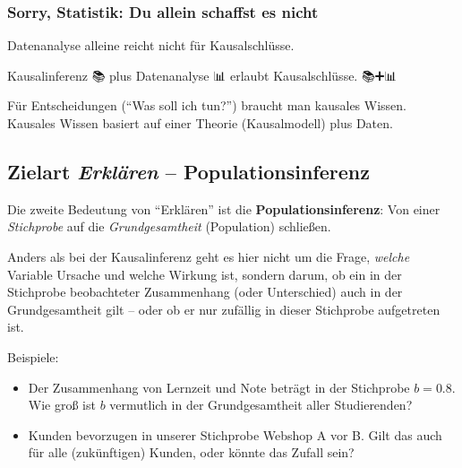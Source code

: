 \documentclass[
  ngerman,
  letterpaper,
  twoside,
  open=any]{scrbook}
\providecommand{\tightlist}{%
  \setlength{\itemsep}{0pt}\setlength{\parskip}{0pt}}\usepackage{longtable,booktabs,array}
\theoremstyle{definition}
\theoremstyle{plain}
\theoremstyle{definition}
\theoremstyle{definition}
\theoremstyle{remark}
\begin{document}
\subsubsection{Sorry, Statistik: Du allein schaffst es
nicht}\label{sorry-statistik-du-allein-schaffst-es-nicht}

Datenanalyse alleine reicht nicht für Kausalschlüsse. 🧟

Kausalinferenz 📚 plus Datenanalyse 📊 erlaubt Kausalschlüsse. 📚➕📊 🟰
🤩

\begin{tcolorbox}[enhanced jigsaw, arc=.35mm, bottomrule=.15mm, bottomtitle=1mm, breakable, colback=white, colbacktitle=quarto-callout-important-color!10!white, colframe=quarto-callout-important-color-frame, coltitle=black, left=2mm, leftrule=.75mm, opacityback=0, opacitybacktitle=0.6, rightrule=.15mm, title=\textcolor{quarto-callout-important-color}{\faExclamation}\hspace{0.5em}{Wichtig}, titlerule=0mm, toprule=.15mm, toptitle=1mm]

Für Entscheidungen (\enquote{Was soll ich tun?}) braucht man kausales
Wissen. Kausales Wissen basiert auf einer Theorie (Kausalmodell) plus
Daten.

\end{tcolorbox}

\subsection{\texorpdfstring{Zielart \emph{Erklären} --
Populationsinferenz}{Zielart Erklären -- Populationsinferenz}}\label{zielart-erkluxe4ren-populationsinferenz}

Die zweite Bedeutung von \enquote{Erklären} ist die
\textbf{Populationsinferenz}: Von einer \emph{Stichprobe} auf die
\emph{Grundgesamtheit} (Population) schließen.

Anders als bei der Kausalinferenz geht es hier nicht um die Frage,
\emph{welche} Variable Ursache und welche Wirkung ist, sondern darum, ob
ein in der Stichprobe beobachteter Zusammenhang (oder Unterschied) auch
in der Grundgesamtheit gilt -- oder ob er nur zufällig in dieser
Stichprobe aufgetreten ist.

Beispiele:

\begin{itemize}
\tightlist
\item
  Der Zusammenhang von Lernzeit und Note beträgt in der Stichprobe
  \(b = 0.8\). Wie groß ist \(b\) vermutlich in der Grundgesamtheit
  aller Studierenden?
\item
  Kunden bevorzugen in unserer Stichprobe Webshop A vor B. Gilt das auch
  für alle (zukünftigen) Kunden, oder könnte das Zufall sein?
\end{itemize}
\end{document}
